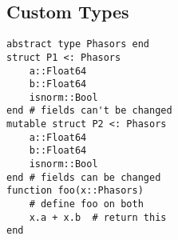 \documentclass{article}
\begin{document}
\begin{multicols*}{3}
\subsection{Custom Types}
\vspace*{-2mm}
\begin{verbatim}
abstract type Phasors end
struct P1 <: Phasors
    a::Float64
    b::Float64
    isnorm::Bool
end # fields can't be changed
mutable struct P2 <: Phasors
    a::Float64
    b::Float64
    isnorm::Bool
end # fields can be changed
function foo(x::Phasors)
    # define foo on both
    x.a + x.b  # return this
end
\end{verbatim}


\end{multicols*}
\end{document}
